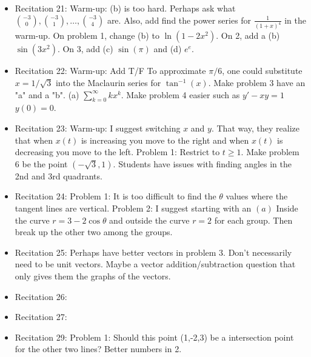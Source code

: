 \documentclass{article}
\begin{document}
\begin{itemize}
\item Recitation 21: Warm-up: (b) is too hard. Perhaps ask what ${-3 \choose 0}, {-3 \choose 1}, \ldots, {-3\choose 4}$ are. Also, add find the power series for $\frac{1}{(1+x)^4}$ in the warm-up. On problem 1, change (b) to $\ln (1-2x^2)$. On 2, add a (b) $\sin(3x^2)$. On 3, add (c) $\sin (\pi)$ and (d) $e^e$. 
\item Recitation 22: Warm-up: Add T/F To approximate $\pi/6$, one could substitute $x=1/\sqrt{3}$ into the Maclaurin series for $\tan^{-1}(x)$. Make problem 3 have an "a" and a "b". (a) $\sum_{k=0}^{\infty} k x^k$. Make problem 4 easier such as $y'-xy=1$ $y(0)=0$. 
\item Recitation 23: Warm-up: I suggest switching $x$ and $y$. That way, they realize that when $x(t)$ is increasing you move to the right and when $x(t)$ is decreasing you move to the left. Problem 1: Restrict to $t \geq 1$. Make problem 6 be the point $(-\sqrt{3}, 1)$. Students have issues with finding angles in the 2nd and 3rd quadrants.
\item Recitation 24: Problem 1: It is too difficult to find the $\theta$ values where the tangent lines are vertical. Problem 2: I suggest starting with an $(a)$ Inside the curve $r=3-2\cos \theta$ and outside the curve $r=2$ for each group. Then break up the other two among the groups. 
\item Recitation 25: Perhaps have better vectors in problem 3. Don't necessarily need to be unit vectors. Maybe a vector addition/subtraction question that only gives them the graphs of the vectors. 
\item Recitation 26: 
\item Recitation 27: 
\item Recitation 29: Problem 1: Should this point (1,-2,3) be a intersection point for the other two lines? Better numbers in 2. 
\end{itemize}
\end{document}
